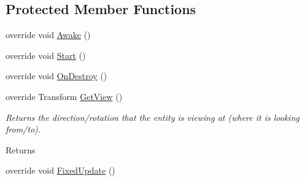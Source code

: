 \subsection*{Protected Member Functions}
\begin{DoxyCompactItemize}
\item 
\hypertarget{class_skyrates_1_1_client_1_1_entity_1_1_entity_player_ship_a6073d56591a8574a1b17236d120b0a1a}{override void \hyperlink{class_skyrates_1_1_client_1_1_entity_1_1_entity_player_ship_a6073d56591a8574a1b17236d120b0a1a}{Awake} ()}\label{class_skyrates_1_1_client_1_1_entity_1_1_entity_player_ship_a6073d56591a8574a1b17236d120b0a1a}

\item 
\hypertarget{class_skyrates_1_1_client_1_1_entity_1_1_entity_player_ship_a96dbdd108d6bd2bc0f74b55358355cb7}{override void \hyperlink{class_skyrates_1_1_client_1_1_entity_1_1_entity_player_ship_a96dbdd108d6bd2bc0f74b55358355cb7}{Start} ()}\label{class_skyrates_1_1_client_1_1_entity_1_1_entity_player_ship_a96dbdd108d6bd2bc0f74b55358355cb7}

\item 
\hypertarget{class_skyrates_1_1_client_1_1_entity_1_1_entity_player_ship_a746b181832ffce648187562ba5f4bf60}{override void \hyperlink{class_skyrates_1_1_client_1_1_entity_1_1_entity_player_ship_a746b181832ffce648187562ba5f4bf60}{On\-Destroy} ()}\label{class_skyrates_1_1_client_1_1_entity_1_1_entity_player_ship_a746b181832ffce648187562ba5f4bf60}

\item 
\hypertarget{class_skyrates_1_1_client_1_1_entity_1_1_entity_player_ship_ac199ff437bdaae367321990c14977a05}{override Transform \hyperlink{class_skyrates_1_1_client_1_1_entity_1_1_entity_player_ship_ac199ff437bdaae367321990c14977a05}{Get\-View} ()}\label{class_skyrates_1_1_client_1_1_entity_1_1_entity_player_ship_ac199ff437bdaae367321990c14977a05}

\begin{DoxyCompactList}\small\item\em Returns the direction/rotation that the entity is viewing at (where it is looking from/to). 

\begin{DoxyReturn}{Returns}

\end{DoxyReturn}
 \end{DoxyCompactList}\item 
\hypertarget{class_skyrates_1_1_client_1_1_entity_1_1_entity_player_ship_ad9fa9f99d2d866c96206420753afc791}{override void \hyperlink{class_skyrates_1_1_client_1_1_entity_1_1_entity_player_ship_ad9fa9f99d2d866c96206420753afc791}{Fixed\-Update} ()}\label{class_skyrates_1_1_client_1_1_entity_1_1_entity_player_ship_ad9fa9f99d2d866c96206420753afc791}


\end{DoxyCompactItemize}
